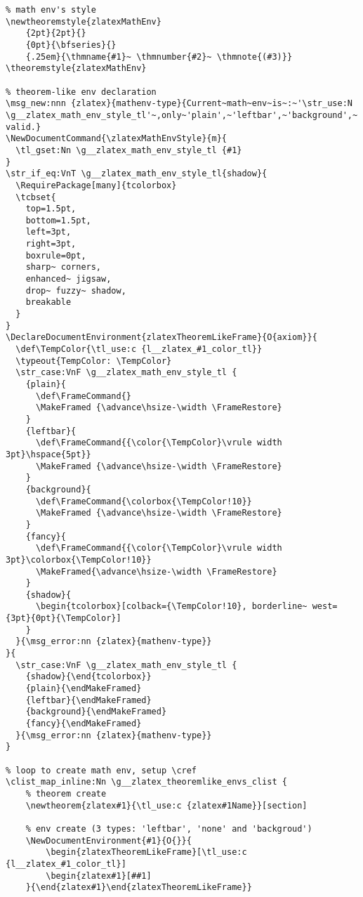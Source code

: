 \begin{verbatim}
% math env's style
\newtheoremstyle{zlatexMathEnv}
    {2pt}{2pt}{}
    {0pt}{\bfseries}{}
    {.25em}{\thmname{#1}~ \thmnumber{#2}~ \thmnote{(#3)}}
\theoremstyle{zlatexMathEnv}

% theorem-like env declaration
\msg_new:nnn {zlatex}{mathenv-type}{Current~math~env~is~:~'\str_use:N \g__zlatex_math_env_style_tl'~,only~'plain',~'leftbar',~'background',~'fancy'~types~are-valid.}
\NewDocumentCommand{\zlatexMathEnvStyle}{m}{
  \tl_gset:Nn \g__zlatex_math_env_style_tl {#1}
}
\str_if_eq:VnT \g__zlatex_math_env_style_tl{shadow}{
  \RequirePackage[many]{tcolorbox}
  \tcbset{
    top=1.5pt,
    bottom=1.5pt,
    left=3pt,
    right=3pt,
    boxrule=0pt,
    sharp~ corners,
    enhanced~ jigsaw,
    drop~ fuzzy~ shadow,
    breakable
  }
}
\DeclareDocumentEnvironment{zlatexTheoremLikeFrame}{O{axiom}}{
  \def\TempColor{\tl_use:c {l__zlatex_#1_color_tl}}
  \typeout{TempColor: \TempColor}
  \str_case:VnF \g__zlatex_math_env_style_tl {
    {plain}{  
      \def\FrameCommand{}
      \MakeFramed {\advance\hsize-\width \FrameRestore}
    }
    {leftbar}{
      \def\FrameCommand{{\color{\TempColor}\vrule width 3pt}\hspace{5pt}}
      \MakeFramed {\advance\hsize-\width \FrameRestore}
    }
    {background}{
      \def\FrameCommand{\colorbox{\TempColor!10}}
      \MakeFramed {\advance\hsize-\width \FrameRestore}
    }
    {fancy}{
      \def\FrameCommand{{\color{\TempColor}\vrule width 3pt}\colorbox{\TempColor!10}}
      \MakeFramed{\advance\hsize-\width \FrameRestore}
    }
    {shadow}{
      \begin{tcolorbox}[colback={\TempColor!10}, borderline~ west={3pt}{0pt}{\TempColor}]
    }
  }{\msg_error:nn {zlatex}{mathenv-type}}
}{
  \str_case:VnF \g__zlatex_math_env_style_tl {
    {shadow}{\end{tcolorbox}}
    {plain}{\endMakeFramed}
    {leftbar}{\endMakeFramed}
    {background}{\endMakeFramed}
    {fancy}{\endMakeFramed}
  }{\msg_error:nn {zlatex}{mathenv-type}}
}

% loop to create math env, setup \cref
\clist_map_inline:Nn \g__zlatex_theoremlike_envs_clist {
    % theorem create
    \newtheorem{zlatex#1}{\tl_use:c {zlatex#1Name}}[section]

    % env create (3 types: 'leftbar', 'none' and 'backgroud')
    \NewDocumentEnvironment{#1}{O{}}{
        \begin{zlatexTheoremLikeFrame}[\tl_use:c {l__zlatex_#1_color_tl}]
        \begin{zlatex#1}[##1]
    }{\end{zlatex#1}\end{zlatexTheoremLikeFrame}}


\end{verbatim}
